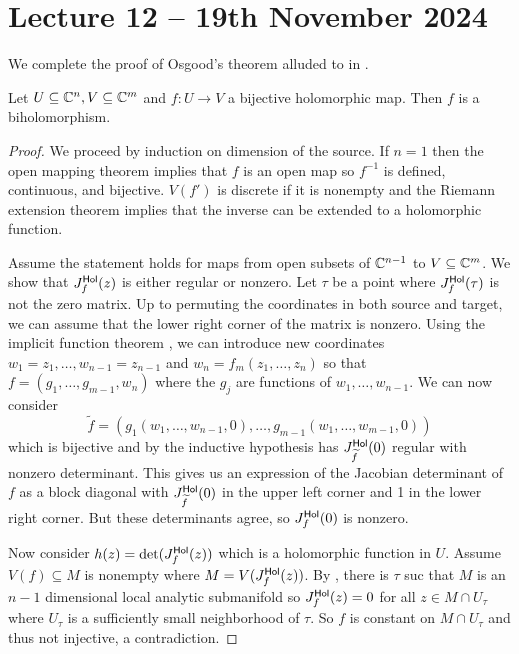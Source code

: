 \section{Lecture 12 -- 19th November 2024}\label{sec: lecture 12}
We complete the proof of Osgood's theorem alluded to in .
\begin{theorem}[Osgood]\label{thm: Osgood}
    Let $U\subseteq\mathbb{C}^{n},V\subseteq\mathbb{C}^{m}$ and $f:U\to V$ a bijective holomorphic map. Then $f$ is a biholomorphism. 
\end{theorem}
\begin{proof}
    We proceed by induction on dimension of the source. If $n=1$ then the open mapping theorem implies that $f$ is an open map so $f^{-1}$ is defined, continuous, and bijective. $V(f')$ is discrete if it is nonempty and the Riemann extension theorem implies that the inverse can be extended to a holomorphic function. 

    Assume the statement holds for maps from open subsets of $\mathbb{C}^{n-1}$ to $V\subseteq\mathbb{C}^{m}$. We show that $J_{f}^{\mathsf{Hol}}(z)$ is either regular or nonzero. Let $\tau$ be a point where $J_{f}^{\mathsf{Hol}}(\tau)$ is not the zero matrix. Up to permuting the coordinates in both source and target, we can assume that the lower right corner of the matrix is nonzero. Using the implicit function theorem , we can introduce new coordinates $w_{1}=z_{1},\dots,w_{n-1}=z_{n-1}$ and $w_{n}=f_{m}(z_{1},\dots,z_{n})$ so that $f=(g_{1},\dots,g_{m-1},w_{n})$ where the $g_{j}$ are functions of $w_{1},\dots,w_{n-1}$. We can now consider $$\widetilde{f}=(g_{1}(w_{1},\dots,w_{n-1},0),\dots,g_{m-1}(w_{1},\dots,w_{m-1},0))$$ which is bijective and by the inductive hypothesis has $J_{\widetilde{f}}^{\mathsf{Hol}}(0)$ regular with nonzero determinant. This gives us an expression of the Jacobian determinant of $f$ as a block diagonal with $J_{\widetilde{f}}^{\mathsf{Hol}}(0)$ in the upper left corner and 1 in the lower right corner. But these determinants agree, so $J_{f}^{\mathsf{Hol}}(0)$ is nonzero. 

    Now consider $h(z)=\det(J_{f}^{\mathsf{Hol}}(z))$ which is a holomorphic function in $U$. Assume $V(f)\subseteq M$ is nonempty where $M=V(J_{f}^{\mathsf{Hol}}(z))$. By , there is $\tau$ suc that $M$ is an $n-1$ dimensional local analytic submanifold so $J_{f}^{\mathsf{Hol}}(z)=0$ for all $z\in M\cap U_{\tau}$ where $U_{\tau}$ is a sufficiently small neighborhood of $\tau$. So $f$ is constant on $M\cap U_{\tau}$ and thus not injective, a contradiction. 
\end{proof}
